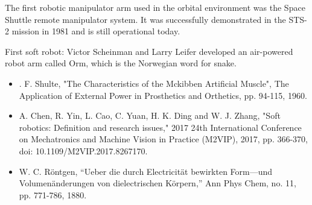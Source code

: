 

% 


The first robotic manipulator arm used in the orbital environment was the Space Shuttle remote manipulator system. It was successfully demonstrated in the STS-2 mission in 1981 and is still operational today.

First soft robot: Victor Scheinman and Larry Leifer developed an air-powered robot arm called Orm, which is the Norwegian word for snake.

\begin{itemize}
  \item . F. Shulte, "The Characteristics of the Mckibben Artificial Muscle", The Application of External Power in Prosthetics and Orthetics, pp. 94-115, 1960.
  \item A. Chen, R. Yin, L. Cao, C. Yuan, H. K. Ding and W. J. Zhang, "Soft robotics: Definition and research issues," 2017 24th International Conference on Mechatronics and Machine Vision in Practice (M2VIP), 2017, pp. 366-370, doi: 10.1109/M2VIP.2017.8267170.
  \item  W. C. R\"{o}ntgen, “Ueber die durch Electricität bewirkten Form—und Volumenänderungen von dielectrischen Körpern,” Ann Phys Chem, no. 11, pp. 771-786, 1880.
\end{itemize}
